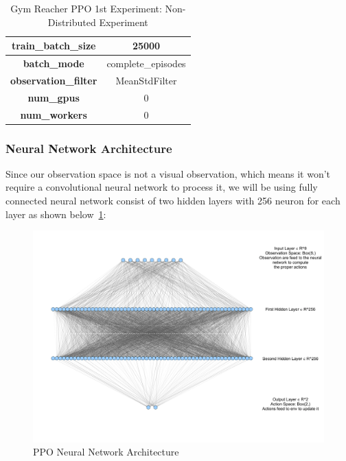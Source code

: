 \begin{table}[!htb]
\begin{tabular}{|c|l|l|c|l|l|}
    \multicolumn{3}{|c|}{\textbf{train\_batch\_size}}                   & \multicolumn{3}{c|}{25000}                                                          \\ \hline
    \multicolumn{3}{|c|}{\textbf{batch\_mode}}                          & \multicolumn{3}{c|}{complete\_episodes}                                             \\ \hline
    \multicolumn{3}{|c|}{\textbf{observation\_filter}}                  & \multicolumn{3}{c|}{MeanStdFilter}                                                  \\ \hline
    \multicolumn{3}{|c|}{\cellcolor[HTML]{C0C0C0}\textbf{num\_gpus}}    & \multicolumn{3}{c|}{\cellcolor[HTML]{C0C0C0}0}                                      \\ \hline
    \multicolumn{3}{|c|}{\cellcolor[HTML]{C0C0C0}\textbf{num\_workers}} & \multicolumn{3}{c|}{\cellcolor[HTML]{C0C0C0}0}                                      \\ \hline
    \end{tabular}
    \caption{Gym Reacher PPO 1st Experiment: Non-Distributed Experiment}
    \label{tab:gym_reacher_ppo_1st_exp}
\end{table}


\subsubsection{Neural Network Architecture}
Since our observation space is not a visual observation, which means it won't require a convolutional neural network to process it, we will be using fully connected neural network consist of two hidden layers with 256 neuron for each layer as shown below~\ref{fig:ppo_nn}:

\begin{figure}[!htb]
    \centering
        \includegraphics[width=\linewidth]{figures/exps/1st_exp/ppo_nn}
        \caption{PPO Neural Network Architecture}
        \label{fig:ppo_nn}
\end{figure}



